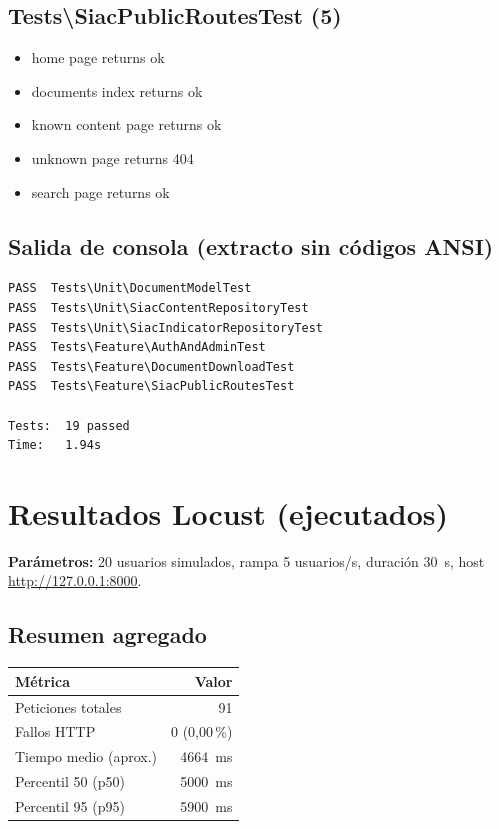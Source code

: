 \subsection{Tests\Feature\textbackslash SiacPublicRoutesTest (5)}
\begin{itemize}
  \item home page returns ok
  \item documents index returns ok
  \item known content page returns ok
  \item unknown page returns 404
  \item search page returns ok
\end{itemize}

\subsection{Salida de consola (extracto sin códigos ANSI)}
\begin{lstlisting}
PASS  Tests\Unit\DocumentModelTest
PASS  Tests\Unit\SiacContentRepositoryTest
PASS  Tests\Unit\SiacIndicatorRepositoryTest
PASS  Tests\Feature\AuthAndAdminTest
PASS  Tests\Feature\DocumentDownloadTest
PASS  Tests\Feature\SiacPublicRoutesTest

Tests:  19 passed
Time:   1.94s
\end{lstlisting}

\section{Resultados Locust (ejecutados)}
\textbf{Parámetros:} 20 usuarios simulados, rampa 5 usuarios/s, duración 30~s, host \url{http://127.0.0.1:8000}.

\subsection{Resumen agregado}
\begin{table}[H]
  \centering
  \begin{tabular}{@{}lr@{}}
    \toprule
    \textbf{Métrica} & \textbf{Valor} \\
    \midrule
    Peticiones totales & 91 \\
    Fallos HTTP & 0 (0,00\,\%) \\
    Tiempo medio (aprox.) & 4664~ms \\
    Percentil 50 (p50) & 5000~ms \\
    Percentil 95 (p95) & 5900~ms \\
    \bottomrule
  \end{tabular}
\end{table}

